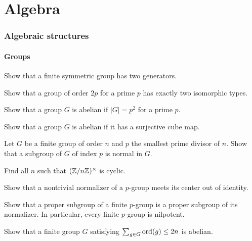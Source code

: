\documentclass[12pt]{article}
\begin{document}
\newpage
\part{Algebra}
\setcounter{section}{0}

\section{Algebraic structures}

	\subsection{Groups}

	\begin{prb}
	Show that a finite symmetric group has two generators.
	\end{prb}

	\begin{prb}
	Show that a group of order $2p$ for a prime $p$ has exactly two isomorphic types.
	\end{prb}

	\begin{prb}
	Show that a group $G$ is abelian if $|G|=p^2$ for a prime $p$.
	\end{prb}

	\begin{prb}
	Show that a group $G$ is abelian if it has a surjective cube map.
	\end{prb}

	\begin{prb}
	Let $G$ be a finite group of order $n$ and $p$ the smallest prime divisor of $n$. Show that a subgroup of $G$ of index $p$ is normal in $G$.
	\end{prb}

	\begin{prb}
	Find all $n$ such that $(\mathbb{Z}/n\mathbb{Z})^\times$ is cyclic.
	\end{prb}

	\begin{prb}
	Show that a nontrivial normalizer of a $p$-group meets its center out of identity.
	\end{prb}

	\begin{prb}
	Show that a proper subgroup of a finite $p$-group is a proper subgroup of its normalizer. In particular, every finite $p$-group is nilpotent.
	\end{prb}

	\begin{prb}
	Show that a finite group $G$ satisfying $\sum_{g\in G}\operatorname{ord}(g)\le2n$ is abelian.
	\end{prb}
\end{document}
